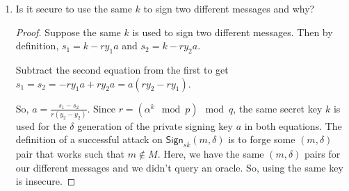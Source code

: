 \documentclass{article}
\begin{document}
\begin{enumerate}
\begin{enumerate}
\begin{proof}
          So, $r = (\beta \alpha^s \alpha^{ry} \mod{p}) \mod{q}$ exactly when
          $\left<r, s\right> = h(x)$, thereby verifying the message.
        \end{proof}

      \item Is it secure to use the same $k$ to sign two different messages and
        why?

        \begin{proof}
          Suppose the same $k$ is used to sign two different messages. Then by
          definition, $s_1 = k - ry_1a$ and $s_2 = k - ry_2a$.

          Subtract the second equation from the first to get $s_1 = s_2 = -ry_1a
          + ry_2a = a(ry_2 - ry_1)$.

          So, $a = \frac{s_1 - s_2}{r(y_2 - y_2)}$. Since $r = (\alpha^k
          \mod{p}) \mod{q}$, the same secret key $k$ is used for the $\delta$
          generation of the private signing key $a$ in both equations. The
          definition of a successful attack on $\textsf{Sign}_{sk}(m, \delta)$
          is to forge some $(m, \delta)$ pair that works such that $m \notin M$.
          Here, we have the same $(m, \delta)$ pairs for our different messages
          and we didn't query an oracle. So, using the same key is insecure.
        \end{proof}

    \end{enumerate}
\end{enumerate}
\end{document}
